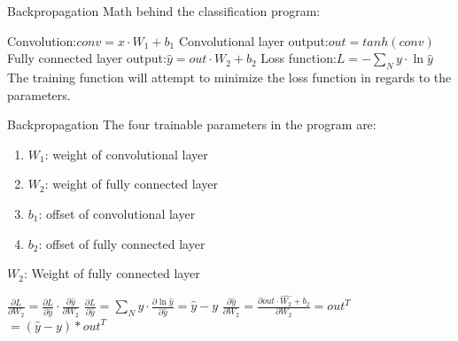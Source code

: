 \documentclass[12pt]{beamer}
\begin{document}
\begin{frame}{Backpropagation}
Math behind the classification program: \newline \newline

Convolution:\space\space\space\space\space\space\space\space\space\space\space\space\space\space\space\space\space\space                   $conv = x \cdot W_1 +b_1$ \newline
Convolutional layer output:\space\space\space\space    $out = tanh(conv)$\newline
Fully connected layer output:\space\space  $\hat{y} = out \cdot W_2 + b_2$\newline
Loss function:\space\space\space\space\space\space\space\space\space\space\space\space\space\space\space\space				   $L = - \sum_{N} y \cdot \ln{\hat{y}}$ \newline
\newline \newline
The training function will attempt to minimize the loss function in regards to the parameters. \newline
\end{frame}
\begin{frame}{Backpropagation}
The four trainable parameters in the program are:
\begin{enumerate}
\item$W_1$: weight of convolutional layer
\item$W_2$: weight of fully connected layer
\item$b_1$: offset of convolutional layer
\item$b_2$: offset of fully connected layer
\end{enumerate}

\end{frame}
\begin{frame}{$W_2$: Weight of fully connected layer}
\begin{Large}
$\frac{\partial{L}}{\partial{W_2}} = \frac{\partial{L}}{\partial{\hat{y}}} \cdot \frac{\partial{\hat{y}}}{\partial{W_2}}$
\newline  \newline
$\frac{\partial{L}}{\partial{\hat{y}}} = \sum_{N} y \cdot \frac{\partial{\ln{\hat{y}}}}{\partial{\hat{y}}} = \hat{y}-y$\newline
$\frac{\partial{\hat{y}}}{\partial{W_2}} = \frac{\partial{\hat{out \cdot W_2 +b_2 }}}{\partial{W_2}}= out^T$ \newline\noindent\makebox[\linewidth]{\rule{\paperwidth}{0.4pt}} \newline
\textbf{$ = (\hat{y} - y) * out^T $}
\end{Large}
\end{frame}
\end{document}

